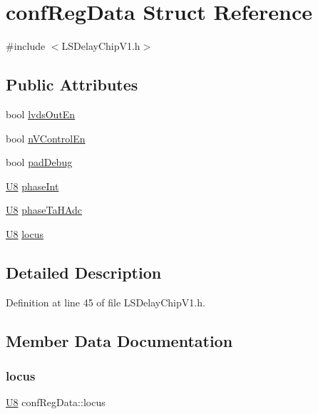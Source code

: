 \hypertarget{structconfRegData}{}\section{conf\+Reg\+Data Struct Reference}
\label{structconfRegData}


{\ttfamily \#include $<$L\+S\+Delay\+Chip\+V1.\+h$>$}

\subsection*{Public Attributes}
\begin{DoxyCompactItemize}
\item 
bool \hyperlink{structconfRegData_a709d8d691ef0c8ea5c4c03aac3d851f1}{lvds\+Out\+En}
\item 
bool \hyperlink{structconfRegData_a62f72429bde3ede255f6d8dfe1401c37}{n\+V\+Control\+En}
\item 
bool \hyperlink{structconfRegData_a4e98d082c44e34995224bd242da493d0}{pad\+Debug}
\item 
\hyperlink{ICECALv3_8h_a3cb25ca6f51f003950f9625ff05536fc}{U8} \hyperlink{structconfRegData_aee4fd08aceaaf19fcb8edfe8aa50f5ab}{phase\+Int}
\item 
\hyperlink{ICECALv3_8h_a3cb25ca6f51f003950f9625ff05536fc}{U8} \hyperlink{structconfRegData_a2e471f30b32e57270cb2edb0e420cf1b}{phase\+Ta\+H\+Adc}
\item 
\hyperlink{ICECALv3_8h_a3cb25ca6f51f003950f9625ff05536fc}{U8} \hyperlink{structconfRegData_a0ed9976dd55237ee70ba3621b0f4f58c}{locus}
\end{DoxyCompactItemize}


\subsection{Detailed Description}


Definition at line 45 of file L\+S\+Delay\+Chip\+V1.\+h.



\subsection{Member Data Documentation}
\mbox{\label{structconfRegData_a0ed9976dd55237ee70ba3621b0f4f58c}} 
\subsubsection{\texorpdfstring{locus}{locus}}
{\footnotesize\ttfamily \hyperlink{ICECALv3_8h_a3cb25ca6f51f003950f9625ff05536fc}{U8} conf\+Reg\+Data\+::locus}



